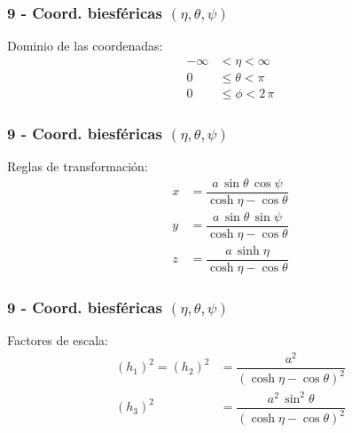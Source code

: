 \documentclass[12pt]{beamer}
\begin{document}
\begin{frame}
\frametitle{9 - Coord. biesféricas $(\eta, \theta, \psi)$}
\fontsize{12}{12}\selectfont
Dominio de las coordenadas:
\pause
\begin{align*}
-\infty &< \eta < \infty \\
0 &\leq \theta < \pi \\
0 &\leq \phi < 2\, \pi
\end{align*}
\end{frame}
\begin{frame}
\frametitle{9 - Coord. biesféricas $(\eta, \theta, \psi)$}
\fontsize{12}{12}\selectfont
Reglas de transformación:
\pause
\begin{align*}
x &= \dfrac{a \, \sin \theta \, \cos \psi}{\cosh \eta - \cos \theta} \\[0.5em]
y &= \dfrac{a \, \sin \theta \, \sin \psi}{\cosh \eta - \cos \theta} \\[0.5em]
z &= \dfrac{a \, \sinh \eta}{\cosh \eta - \cos \theta}
\end{align*}
\end{frame}
\begin{frame}
\frametitle{9 - Coord. biesféricas $(\eta, \theta, \psi)$}
\fontsize{12}{12}\selectfont
Factores de escala:
\pause
\begin{align*}
(h_{1})^{2} = (h_{2})^{2} &= \dfrac{a^{2}}{(\cosh \eta - \cos \theta)^{2}} \\[0.5em]
(h_{3})^{2} &= \dfrac{a^{2} \, \sin^{2} \theta}{(\cosh \eta - \cos \theta)^{2}}
\end{align*}
\end{frame}
\end{document}
